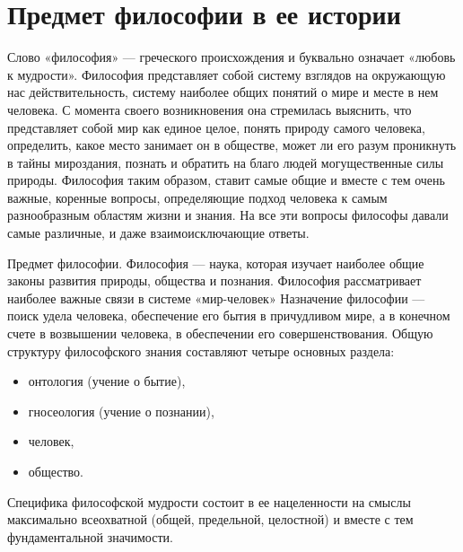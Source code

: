 \documentclass[12pt]{article}
\begin{document}
\tableofcontents


\newpage
\section{Предмет философии в ее истории}
Слово  «философия» --- греческого  происхождения  и  буквально  означает  «любовь  к  мудрости».
Философия
представляет собой систему взглядов на окружающую нас действительность, систему наиболее общих понятий
о мире и месте в нем человека. С момента своего возникновения она стремилась выяснить, что представляет
собой мир как единое целое, понять природу самого человека, определить,
какое место занимает он в обществе,
может ли его разум проникнуть в тайны мироздания, познать и обратить на благо людей могущественные силы
природы. Философия таким образом, ставит самые общие и вместе с тем очень важные, коренные вопросы,
определяющие  подход  человека  к  самым  разнообразным  областям  жизни  и  знания. 
На  все  эти  вопросы
философы давали самые различные, и даже взаимоисключающие ответы.

Предмет философии. Философия --- наука, которая изучает наиболее общие законы развития природы, общества
и познания. Философия рассматривает наиболее важные связи в системе «мир-человек»
Назначение философии --- поиск удела человека, обеспечение его бытия в причудливом мире,
а в конечном счете
в  возвышении  человека,  в  обеспечении  его  совершенствования.  Общую  структуру  философского  знания
составляют четыре основных раздела:
\begin{itemize}
  \item онтология (учение о бытие),
  \item гносеология (учение о познании),
  \item человек,
  \item общество.
\end{itemize}
Специфика философской мудрости состоит в ее нацеленности на смыслы максимально всеохватной (общей,
предельной, целостной) и вместе с тем фундаментальной значимости.


\newpage
\end{document}
